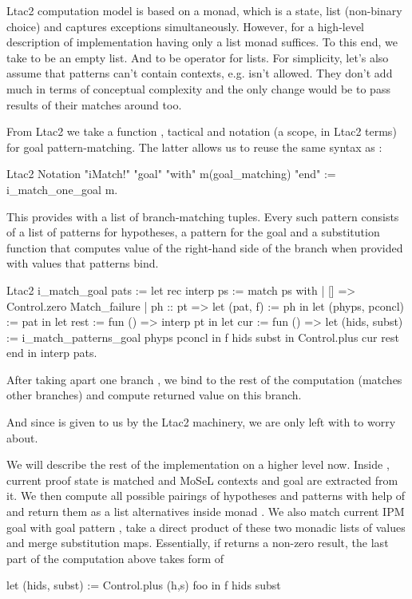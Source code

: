 Ltac2 computation model is based on a monad, which is a state, list (non-binary choice) and captures exceptions simultaneously.
However, for a high-level description of implementation having only a list monad  suffices.
To this end, we take  to be an empty list.
And  to be  operator for lists.
For simplicity, let's also assume that patterns can't contain contexts, e.g.  isn't allowed.
They don't add much in terms of conceptual complexity and the only change would be to pass results of their matches around too.

From Ltac2 we take a function ,  tactical and notation (a scope, in Ltac2 terms) for goal pattern-matching.
The latter allows us to reuse the same syntax as :
\begin{coq}
Ltac2 Notation "iMatch!" "goal" "with" m(goal_matching) "end" :=
  i_match_one_goal m.
\end{coq}
This provides  with a list of branch-matching tuples.
Every such pattern consists of a list of patterns for hypotheses, a pattern for the goal and a substitution function that computes value of the right-hand side of the branch when provided with values that patterns bind.

\begin{coq}
Ltac2 i_match_goal pats :=
  let rec interp ps := match ps with
  | [] => Control.zero Match_failure
  | ph :: pt =>
    let (pat, f) := ph in
    let (phyps, pconcl) := pat in
    let rest := fun () => interp pt in
    let cur := fun () =>
      let (hids, subst) := i_match_patterns_goal phyps pconcl in
      f hids subst
    in Control.plus cur rest
  end in
  interp pats.
\end{coq}

After taking apart one branch , we bind  to the rest of the computation (matches other branches) and compute returned value on this branch.

And since  is given to us by the Ltac2 machinery, we are only left with  to worry about.

We will describe the rest of the implementation on a higher level now.
Inside , current proof state is matched and MoSeL contexts and goal are extracted from it.
We then compute all possible pairings of hypotheses and patterns with help of  and return them as a list alternatives inside monad .
We also match current IPM goal with goal pattern , take a direct product of these two monadic lists of values and merge substitution maps.
Essentially, if  returns a non-zero result, the last part of the computation above takes form of
\begin{coq}
let (hids, subst) := Control.plus (h,s) foo in
f hids subst
\end{coq}

